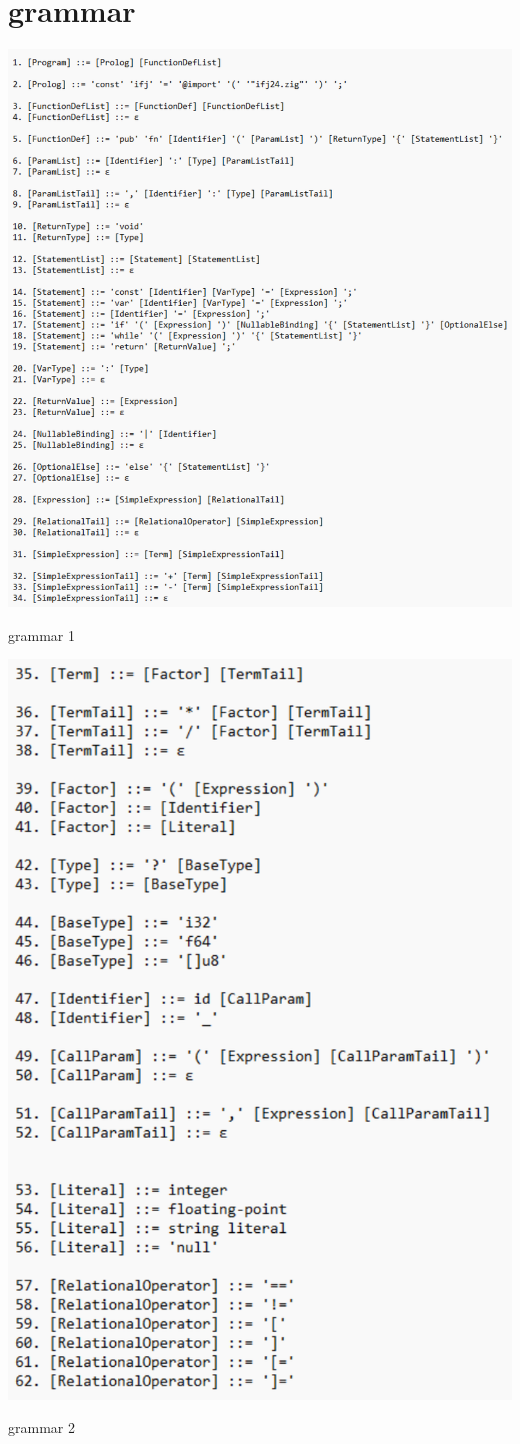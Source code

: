 \documentclass[a4paper, 11pt]{article}
\begin{document}
	\begin{table}[!ht]
        \section{grammar}
		\centering
		\includegraphics[width=1\linewidth]{grammar1.pdf}
		\caption{grammar 1}
		\label{table:grammar part 1.pdf}
	\end{table}

    
	\begin{table}[!ht]
		\centering
		\includegraphics[width=0.7\linewidth]{grammar2.pdf}
		\caption{grammar 2}
		\label{table:grammar part 2.pdf}
	\end{table}
\end{document}
